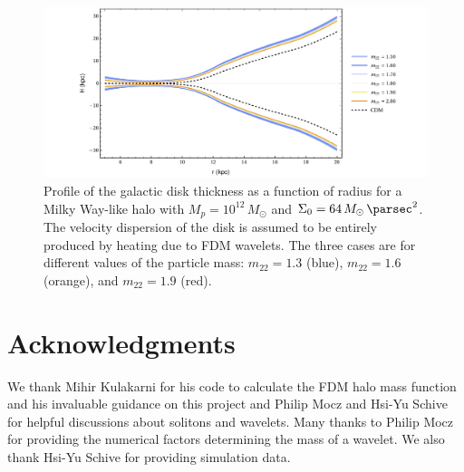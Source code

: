 \documentclass[usenatbib]{mnras}
\begin{document}
\begin{figure}
\includegraphics[width=\columnwidth]{disk_shape_FDM}
\vspace*{-5mm}
\caption{Profile of the galactic disk thickness as a function of radius for a Milky Way-like halo with $M_p = 10^{12} \, M_\odot$ and $\Sigma_0 = 64 \, M_\odot \, \si{\per\parsec^2}$. The velocity dispersion of the disk is assumed to be entirely produced by heating due to FDM wavelets. The three cases are for different values of the particle mass: $m_{22} = 1.3$ (blue), $m_{22} = 1.6$ (orange), and $m_{22} = 1.9$ (red). }
\label{fig:disk_shape_FDM}
\end{figure}


\section*{Acknowledgments}
We thank Mihir Kulakarni for his code to calculate the FDM halo mass function and his invaluable guidance on this project and Philip Mocz and Hsi-Yu Schive for helpful discussions about solitons and wavelets. Many thanks to Philip Mocz for providing the numerical factors determining the mass of a wavelet. We also thank Hsi-Yu Schive for providing simulation data. 




 
\end{document}

